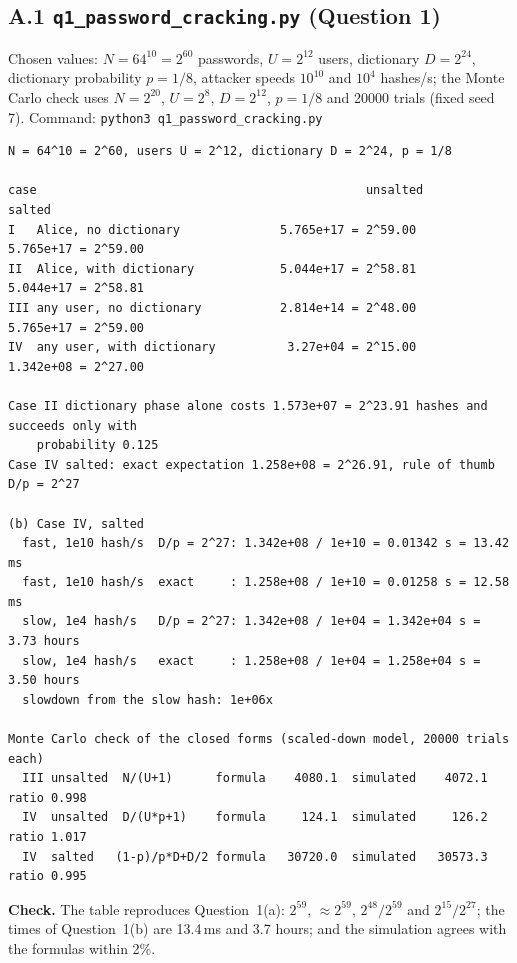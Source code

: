 \documentclass[11pt,a4paper]{article}
\begin{document}
\subsection*{A.1 \texttt{q1\_password\_cracking.py} (Question 1)}
Chosen values: $N=64^{10}=2^{60}$ passwords, $U=2^{12}$ users, dictionary $D=2^{24}$, dictionary probability
$p=1/8$, attacker speeds $10^{10}$ and $10^{4}$ hashes/s; the Monte Carlo check uses $N=2^{20}$, $U=2^{8}$,
$D=2^{12}$, $p=1/8$ and 20000 trials (fixed seed 7). Command: \texttt{python3 q1\_password\_cracking.py}
\begin{Verbatim}[fontsize=\footnotesize, frame=single]
N = 64^10 = 2^60, users U = 2^12, dictionary D = 2^24, p = 1/8

case                                              unsalted                    salted
I   Alice, no dictionary              5.765e+17 = 2^59.00      5.765e+17 = 2^59.00
II  Alice, with dictionary            5.044e+17 = 2^58.81      5.044e+17 = 2^58.81
III any user, no dictionary           2.814e+14 = 2^48.00      5.765e+17 = 2^59.00
IV  any user, with dictionary          3.27e+04 = 2^15.00      1.342e+08 = 2^27.00

Case II dictionary phase alone costs 1.573e+07 = 2^23.91 hashes and succeeds only with
    probability 0.125
Case IV salted: exact expectation 1.258e+08 = 2^26.91, rule of thumb D/p = 2^27

(b) Case IV, salted
  fast, 1e10 hash/s  D/p = 2^27: 1.342e+08 / 1e+10 = 0.01342 s = 13.42 ms
  fast, 1e10 hash/s  exact     : 1.258e+08 / 1e+10 = 0.01258 s = 12.58 ms
  slow, 1e4 hash/s   D/p = 2^27: 1.342e+08 / 1e+04 = 1.342e+04 s = 3.73 hours
  slow, 1e4 hash/s   exact     : 1.258e+08 / 1e+04 = 1.258e+04 s = 3.50 hours
  slowdown from the slow hash: 1e+06x

Monte Carlo check of the closed forms (scaled-down model, 20000 trials each)
  III unsalted  N/(U+1)      formula    4080.1  simulated    4072.1  ratio 0.998
  IV  unsalted  D/(U*p+1)    formula     124.1  simulated     126.2  ratio 1.017
  IV  salted   (1-p)/p*D+D/2 formula   30720.0  simulated   30573.3  ratio 0.995
\end{Verbatim}
\textbf{Check.} The table reproduces Question~1(a): $2^{59}$, $\approx2^{59}$, $2^{48}/2^{59}$ and $2^{15}/2^{27}$;
the times of Question~1(b) are 13.4\,ms and 3.7 hours; and the simulation agrees with the formulas within 2\%.

\needspace{16.6cm}
\end{document}
